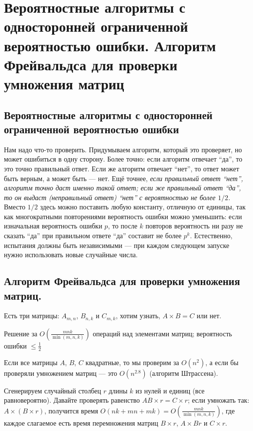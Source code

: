 \hypertarget{Freivalds}{}
\section{Вероятностные алгоритмы с односторонней ограниченной вероятностью ошибки. Алгоритм Фрейвальдса для проверки умножения матриц}

\secauthor{\ivan}

\subsection{Вероятностные алгоритмы с односторонней ограниченной вероятностью ошибки}

Нам надо что-то проверить. Придумываем алгоритм, который это проверяет, но может ошибиться в одну сторону. Более точно: если алгоритм отвечает ``да'', то это точно правильный ответ. Если же алгоритм отвечает ``нет'', то ответ может быть верным, а может быть --- нет. Ещё точнее, \emph{если правильный ответ ``нет'', алгоритм точно даст именно такой ответ; если же правильный ответ ``да'', то он выдаст (неправильный ответ) ``нет'' с вероятностью не более $1/2$.} Вместо $1/2$ здесь можно поставить любую константу, отличную от единицы, так как многократными повторениями вероятность ошибки можно уменьшить: если изначальная вероятность ошибки  $p$, то после $k$ повторов вероятность ни разу не сказать ``да'' при правильном ответе ``да'' составит не более $p^k$. Естественно, испытания должны быть независимыми --- при каждом следующем запуске нужно использовать новые случайные числа.

\subsection{Алгоритм Фрейвальдса для проверки умножения матриц.}

Есть три матрицы: $A_{m,n}$, $B_{n,k}$ и $C_{m,k}$, хотим узнать, $A\times B=C$ или нет.

\begin{algodescription}{Решение за $O\left(\frac{mnk}{\min(m,n,k)}\right)$ операций над элементами матриц; вероятность ошибки $\le\frac{1}{2}$}

\begin{nb*}Если все матрицы $A$, $B$, $C$ квадратные, то мы проверим за $O(n^2)$, а если бы проверяли умножением матриц --- это $O(n^{2.8})$ (алгоритм Штрассена).
\end{nb*}

Сгенерируем случайный столбец $r$ длины $k$ из нулей и единиц (все равновероятно). Давайте проверять равенство $AB\times r=C\times r$; если умножать так: $A\times (B\times r)$, получится время $O(nk+mn+mk)=O\left(\frac{mnk}{\min(m,n,k)}\right)$, где каждое слагаемое есть время перемножения матриц $B\times r$, $A \times Br$ и $C\times r$.
\end{algodescription}


